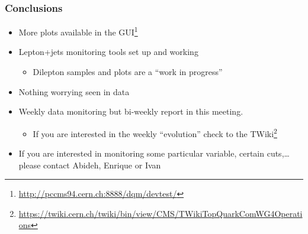 \documentclass{beamer}
\begin{document}
\begin{frame}
\frametitle{Conclusions}
\begin{itemize}
\item More plots available in the GUI\footnote{\url{http://pccms94.cern.ch:8888/dqm/devtest/}}
\item Lepton+jets monitoring tools set up and working%
\begin{itemize}
 \item Dilepton samples and plots are a ``work in progress''
\end{itemize}
\item Nothing worrying seen in data
\item Weekly data monitoring but bi-weekly report in this meeting.
\begin{itemize}
\item If you are interested in the weekly ``evolution'' check to the TWiki\footnote{\url{https://twiki.cern.ch/twiki/bin/view/CMS/TWikiTopQuarkComWG4Operations}}
\end{itemize}
\item If you are interested in monitoring some particular variable, certain cuts,\ldots please contact Abideh, Enrique or Ivan
\end{itemize}

\end{frame}
\end{document}
